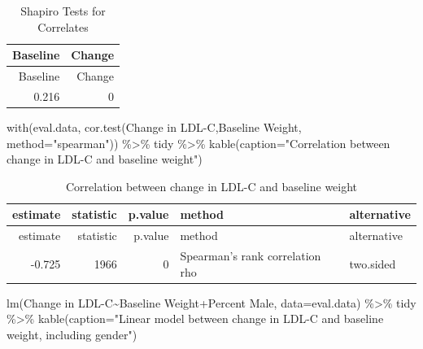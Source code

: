 \documentclass[
]{article}
\newenvironment{Shaded}{\begin{snugshade}}{\end{snugshade}}
\newcommand{\AttributeTok}[1]{\textcolor[rgb]{0.77,0.63,0.00}{#1}}
\newcommand{\FunctionTok}[1]{\textcolor[rgb]{0.00,0.00,0.00}{#1}}
\newcommand{\NormalTok}[1]{#1}
\newcommand{\SpecialCharTok}[1]{\textcolor[rgb]{0.00,0.00,0.00}{#1}}
\newcommand{\StringTok}[1]{\textcolor[rgb]{0.31,0.60,0.02}{#1}}
\begin{document}
\begin{longtable}[]{@{}rr@{}}
\caption{Shapiro Tests for Correlates}\tabularnewline
\toprule
Baseline & Change \\
\midrule
\endfirsthead
\toprule
Baseline & Change \\
\midrule
\endhead
0.216 & 0 \\
\bottomrule
\end{longtable}

\begin{Shaded}
\begin{Highlighting}[]
\FunctionTok{with}\NormalTok{(eval.data, }\FunctionTok{cor.test}\NormalTok{(}\StringTok{\textasciigrave{}}\AttributeTok{Change in LDL{-}C}\StringTok{\textasciigrave{}}\NormalTok{,}\StringTok{\textasciigrave{}}\AttributeTok{Baseline Weight}\StringTok{\textasciigrave{}}\NormalTok{, }\AttributeTok{method=}\StringTok{"spearman"}\NormalTok{)) }\SpecialCharTok{\%\textgreater{}\%}\NormalTok{ tidy }\SpecialCharTok{\%\textgreater{}\%} \FunctionTok{kable}\NormalTok{(}\AttributeTok{caption=}\StringTok{"Correlation between change in LDL{-}C and baseline weight"}\NormalTok{)}
\end{Highlighting}
\end{Shaded}

\begin{longtable}[]{@{}rrrll@{}}
\caption{Correlation between change in LDL-C and baseline
weight}\tabularnewline
\toprule
estimate & statistic & p.value & method & alternative \\
\midrule
\endfirsthead
\toprule
estimate & statistic & p.value & method & alternative \\
\midrule
\endhead
-0.725 & 1966 & 0 & Spearman's rank correlation rho & two.sided \\
\bottomrule
\end{longtable}

\begin{Shaded}
\begin{Highlighting}[]
\FunctionTok{lm}\NormalTok{(}\StringTok{\textasciigrave{}}\AttributeTok{Change in LDL{-}C}\StringTok{\textasciigrave{}}\SpecialCharTok{\textasciitilde{}}\StringTok{\textasciigrave{}}\AttributeTok{Baseline Weight}\StringTok{\textasciigrave{}}\SpecialCharTok{+}\StringTok{\textasciigrave{}}\AttributeTok{Percent Male}\StringTok{\textasciigrave{}}\NormalTok{, }\AttributeTok{data=}\NormalTok{eval.data) }\SpecialCharTok{\%\textgreater{}\%}\NormalTok{ tidy }\SpecialCharTok{\%\textgreater{}\%} \FunctionTok{kable}\NormalTok{(}\AttributeTok{caption=}\StringTok{"Linear model between change in LDL{-}C and baseline weight, including gender"}\NormalTok{)}
\end{Highlighting}
\end{Shaded}
\end{document}
